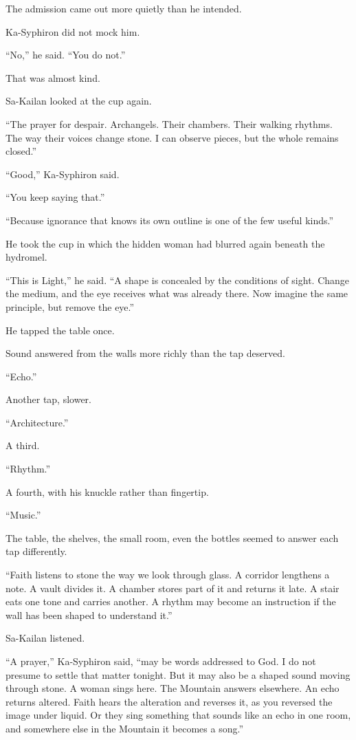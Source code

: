 The admission came out more quietly than he intended.\par
Ka-Syphiron did not mock him.\par
“No,” he said. “You do not.”\par
That was almost kind.\par
Sa-Kailan looked at the cup again.\par
“The prayer for despair. Archangels. Their chambers. Their walking rhythms. The way their voices change stone. I can observe pieces, but the whole remains closed.”\par
“Good,” Ka-Syphiron said.\par
“You keep saying that.”\par
“Because ignorance that knows its own outline is one of the few useful kinds.”\par
He took the cup in which the hidden woman had blurred again beneath the hydromel.\par
“This is Light,” he said. “A shape is concealed by the conditions of sight. Change the medium, and the eye receives what was already there. Now imagine the same principle, but remove the eye.”\par
He tapped the table once.\par
Sound answered from the walls more richly than the tap deserved.\par
“Echo.”\par
Another tap, slower.\par
“Architecture.”\par
A third.\par
“Rhythm.”\par
A fourth, with his knuckle rather than fingertip.\par
“Music.”\par
The table, the shelves, the small room, even the bottles seemed to answer each tap differently.\par
“Faith listens to stone the way we look through glass. A corridor lengthens a note. A vault divides it. A chamber stores part of it and returns it late. A stair eats one tone and carries another. A rhythm may become an instruction if the wall has been shaped to understand it.”\par
Sa-Kailan listened.\par
“A prayer,” Ka-Syphiron said, “may be words addressed to God. I do not presume to settle that matter tonight. But it may also be a shaped sound moving through stone. A woman sings here. The Mountain answers elsewhere. An echo returns altered. Faith hears the alteration and reverses it, as you reversed the image under liquid. Or they sing something that sounds like an echo in one room, and somewhere else in the Mountain it becomes a song.”\par
